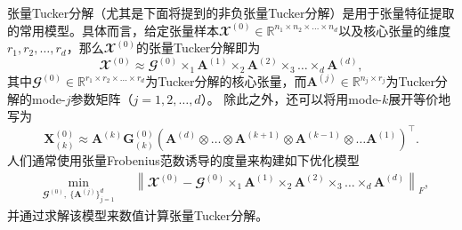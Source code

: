 张量Tucker分解（尤其是下面将提到的非负张量Tucker分解）是用于张量特征提取的常用模型。具体而言，给定张量样本$\mathbfcal{X}^{(0)}\in \mathbb{R}^{n_1 \times n_2 \times \ldots \times n_d}$以及核心张量的维度$r_1, r_2, \ldots, r_d$，那么$\mathbfcal{X}^{(0)}$的张量Tucker分解即为
\begin{equation}\label{eq:tucker-approx}
	\mathbfcal{X}^{(0)}\approx\mathbfcal{G}^{(0)} \times_{1} \boldsymbol{A}^{(1)} \times_{2} \boldsymbol{A}^{(2)} \times_{3} \ldots \times_{d} \boldsymbol{A}^{(d)},
\end{equation}
其中$\mathbfcal{G}^{(0)} \in \mathbb{R}^{r_1 \times r_2 \times \ldots \times r_d}$为Tucker分解的核心张量，而$\boldsymbol{A}^{(j)}\in\mathbb{R}^{n_{j}\times r_{j}}$为Tucker分解的mode-$j$参数矩阵（$j=1,2,\ldots,d$）。
除此之外，还可以将用mode-$k$展开等价地写为
\begin{equation*}
		\boldsymbol{X}^{(0)}_{(k)} \approx \boldsymbol{A}^{(k)} \boldsymbol{G}^{(0)}_{(k)}\left(\boldsymbol{A}^{(d)} \otimes \ldots \otimes \boldsymbol{A}^{(k+1)} \otimes \boldsymbol{A}^{(k-1)} \otimes \ldots \boldsymbol{A}^{(1)}\right)^{\top}.
\end{equation*}
人们通常使用张量Frobenius范数诱导的度量来构建如下优化模型
\begin{equation*}\label{tk}
	\begin{aligned}
		&\underset{\mathbfcal{G}^{(0)},~\{\boldsymbol{A}^{(j)}\}_{j=1}^{d}}{\min}&& {\left\|\mathbfcal{X}^{(0)}-\mathbfcal{G}^{(0)} \times_{1} \boldsymbol{A}^{(1)} \times_{2} \boldsymbol{A}^{(2)} \times_{3} \ldots \times_{d} \boldsymbol{A}^{(d)} \right\|_{F}},
	\end{aligned}
\end{equation*}
并通过求解该模型来数值计算张量Tucker分解。
